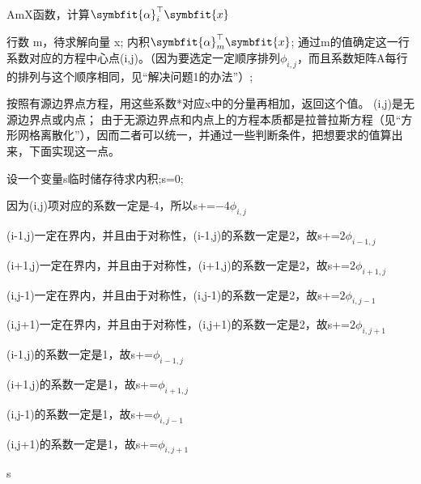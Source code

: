 \documentclass[10pt, a4paper]{article}
\newcommand\vbf{\symbfit}
\begin{document}
    \begin{algorithm}[H]  
        \caption{AmX函数，计算$\vbf{\alpha}_i^\top \vbf{x}$}  
        \label{alg:AmX函数}  
        \begin{algorithmic}[1]  
        \Require  
            行数 m，待求解向量 x; 
        \Ensure  
            内积$\vbf{\alpha}_m^\top \vbf{x}$;
        \State 通过m的值确定这一行系数对应的方程中心点(i,j)。（因为要选定一定顺序排列$\phi_{i,j}$，而且系数矩阵A每行的排列与这个顺序相同，见“解决问题1的办法”）;

            \State 按照有源边界点方程，用这些系数*对应x中的分量再相加，返回这个值。
        \Else
            \State (i,j)是无源边界点或内点；
            \State 由于无源边界点和内点上的方程本质都是拉普拉斯方程（见“方形网格离散化”），因而二者可以统一，并通过一些判断条件，把想要求的值算出来，下面实现这一点。

            \State 设一个变量s临时储存待求内积;s=0;
            
            \State 因为(i,j)项对应的系数一定是-4，所以s+=$-4\phi_{i,j}$

                \State (i-1,j)一定在界内，并且由于对称性，(i-1,j)的系数一定是2，故s+=$2\phi_{i-1,j}$
            \EndIf

                \State (i+1,j)一定在界内，并且由于对称性，(i+1,j)的系数一定是2，故s+=$2\phi_{i+1,j}$
            \EndIf
            
                \State (i,j-1)一定在界内，并且由于对称性，(i,j-1)的系数一定是2，故s+=$2\phi_{i,j-1}$
            \EndIf

                \State (i,j+1)一定在界内，并且由于对称性，(i,j+1)的系数一定是2，故s+=$2\phi_{i,j+1}$
            \EndIf

                \State (i-1,j)的系数一定是1，故s+=$\phi_{i-1,j}$
            \EndIf

                \State (i+1,j)的系数一定是1，故s+=$\phi_{i+1,j}$
            \EndIf
            
                \State (i,j-1)的系数一定是1，故s+=$\phi_{i,j-1}$
            \EndIf

                \State (i,j+1)的系数一定是1，故s+=$\phi_{i,j+1}$
            \EndIf

            \State\Return s
        \EndIf
        \end{algorithmic}  
      \end{algorithm}
\end{document}
